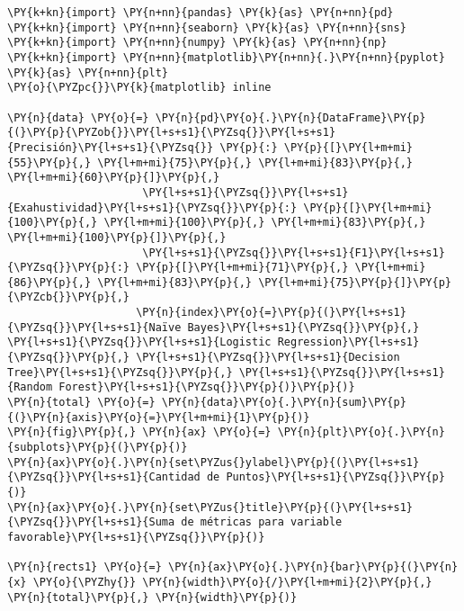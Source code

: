     \begin{tcolorbox}[breakable, size=fbox, boxrule=1pt, pad at break*=1mm,colback=cellbackground, colframe=cellborder]
\begin{Verbatim}[commandchars=\\\{\}]
\PY{k+kn}{import} \PY{n+nn}{pandas} \PY{k}{as} \PY{n+nn}{pd} 
\PY{k+kn}{import} \PY{n+nn}{seaborn} \PY{k}{as} \PY{n+nn}{sns} 
\PY{k+kn}{import} \PY{n+nn}{numpy} \PY{k}{as} \PY{n+nn}{np}
\PY{k+kn}{import} \PY{n+nn}{matplotlib}\PY{n+nn}{.}\PY{n+nn}{pyplot} \PY{k}{as} \PY{n+nn}{plt}
\PY{o}{\PYZpc{}}\PY{k}{matplotlib} inline

\PY{n}{data} \PY{o}{=} \PY{n}{pd}\PY{o}{.}\PY{n}{DataFrame}\PY{p}{(}\PY{p}{\PYZob{}}\PY{l+s+s1}{\PYZsq{}}\PY{l+s+s1}{Precisión}\PY{l+s+s1}{\PYZsq{}} \PY{p}{:} \PY{p}{[}\PY{l+m+mi}{55}\PY{p}{,} \PY{l+m+mi}{75}\PY{p}{,} \PY{l+m+mi}{83}\PY{p}{,} \PY{l+m+mi}{60}\PY{p}{]}\PY{p}{,}
                     \PY{l+s+s1}{\PYZsq{}}\PY{l+s+s1}{Exahustividad}\PY{l+s+s1}{\PYZsq{}}\PY{p}{:} \PY{p}{[}\PY{l+m+mi}{100}\PY{p}{,} \PY{l+m+mi}{100}\PY{p}{,} \PY{l+m+mi}{83}\PY{p}{,} \PY{l+m+mi}{100}\PY{p}{]}\PY{p}{,}
                     \PY{l+s+s1}{\PYZsq{}}\PY{l+s+s1}{F1}\PY{l+s+s1}{\PYZsq{}}\PY{p}{:} \PY{p}{[}\PY{l+m+mi}{71}\PY{p}{,} \PY{l+m+mi}{86}\PY{p}{,} \PY{l+m+mi}{83}\PY{p}{,} \PY{l+m+mi}{75}\PY{p}{]}\PY{p}{\PYZcb{}}\PY{p}{,}
                    \PY{n}{index}\PY{o}{=}\PY{p}{(}\PY{l+s+s1}{\PYZsq{}}\PY{l+s+s1}{Naïve Bayes}\PY{l+s+s1}{\PYZsq{}}\PY{p}{,} \PY{l+s+s1}{\PYZsq{}}\PY{l+s+s1}{Logistic Regression}\PY{l+s+s1}{\PYZsq{}}\PY{p}{,} \PY{l+s+s1}{\PYZsq{}}\PY{l+s+s1}{Decision Tree}\PY{l+s+s1}{\PYZsq{}}\PY{p}{,} \PY{l+s+s1}{\PYZsq{}}\PY{l+s+s1}{Random Forest}\PY{l+s+s1}{\PYZsq{}}\PY{p}{)}\PY{p}{)}
\PY{n}{total} \PY{o}{=} \PY{n}{data}\PY{o}{.}\PY{n}{sum}\PY{p}{(}\PY{n}{axis}\PY{o}{=}\PY{l+m+mi}{1}\PY{p}{)}
\PY{n}{fig}\PY{p}{,} \PY{n}{ax} \PY{o}{=} \PY{n}{plt}\PY{o}{.}\PY{n}{subplots}\PY{p}{(}\PY{p}{)}
\PY{n}{ax}\PY{o}{.}\PY{n}{set\PYZus{}ylabel}\PY{p}{(}\PY{l+s+s1}{\PYZsq{}}\PY{l+s+s1}{Cantidad de Puntos}\PY{l+s+s1}{\PYZsq{}}\PY{p}{)}
\PY{n}{ax}\PY{o}{.}\PY{n}{set\PYZus{}title}\PY{p}{(}\PY{l+s+s1}{\PYZsq{}}\PY{l+s+s1}{Suma de métricas para variable favorable}\PY{l+s+s1}{\PYZsq{}}\PY{p}{)}

\PY{n}{rects1} \PY{o}{=} \PY{n}{ax}\PY{o}{.}\PY{n}{bar}\PY{p}{(}\PY{n}{x} \PY{o}{\PYZhy{}} \PY{n}{width}\PY{o}{/}\PY{l+m+mi}{2}\PY{p}{,} \PY{n}{total}\PY{p}{,} \PY{n}{width}\PY{p}{)}


\end{Verbatim}
\end{tcolorbox}
